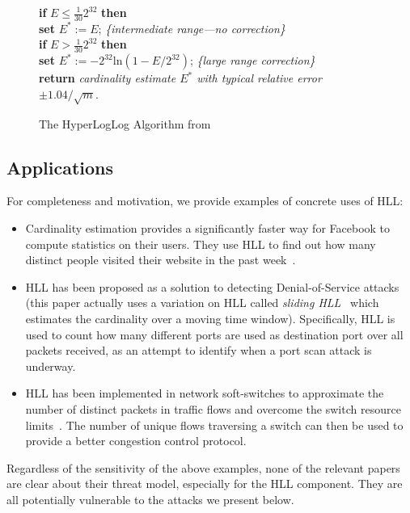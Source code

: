 \documentclass[11pt]{article}
\begin{document}
\begin{figure}[ht]
{{\begin{minipage}{40em}
\begin{flushleft}
\textbf{if} $E \le \frac{1}{30}2^{32}$ \textbf{then}\\
    \hspace{2em} \textbf{set} $E^*:= E$; \hfill \textit{\{intermediate range—no correction\}}\\
\textbf{if} $E > \frac{1}{30}2^{32}$ \textbf{then}\\
    \hspace{2em}  \textbf{set} $E^*:= -2^{32}$ln$(1 - E/2^{32})$; \hfill \textit{\{large range correction\}}\\
\textbf{return} \textit{cardinality estimate $E^*$ with typical relative error} $\pm1.04/\sqrt{m}$.
\end{flushleft}
\end{minipage}
}}
\caption{The HyperLogLog Algorithm from~\cite{hll}}
\label{fig:hll}
\end{figure}

\subsection{Applications}
For completeness and motivation, we provide examples of concrete uses of HLL:
\begin{itemize}
    \item Cardinality estimation provides a significantly faster way for Facebook to compute statistics on their users. They use HLL to find out how many distinct people visited their website in the past week~\cite{fbhll}.
    \item HLL has been proposed as a solution to detecting Denial-of-Service attacks~\cite{portscanhll} (this paper actually uses a variation on HLL called \emph{sliding HLL}~\cite{slidinghll} which estimates the cardinality over a moving time window). Specifically, HLL is used to count how many different ports are used as destination port over all packets received, as an attempt to identify when a port scan attack is underway.
    \item HLL has been implemented in network soft-switches to approximate the number of distinct packets in traffic flows and overcome the switch resource limits~\cite{flexswitch}. The number of unique flows traversing a switch can then be used to provide a better congestion control protocol.
\end{itemize}

Regardless of the sensitivity of the above examples, none of the relevant papers are clear about their threat model, especially for the HLL component.  They are all potentially vulnerable to the attacks we present below.
\end{document}
